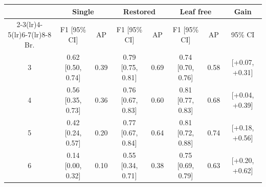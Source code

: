 \begin{tabular}{@{}cccccccc@{}}
\toprule
& \multicolumn{2}{c}{Single} & \multicolumn{2}{c}{Restored} & \multicolumn{2}{c}{Leaf free} & Gain\\
\cmidrule(lr){2-3}\cmidrule(lr){4-5}\cmidrule(lr){6-7}\cmidrule(lr){8-8}
Br. & F1 [95\% CI] & AP & F1 [95\% CI] & AP & F1 [95\% CI] & AP & 95\% CI\\
\midrule
3 & 0.62 [0.50, 0.74] & 0.39 & 0.79 [0.75, 0.81] & 0.69 & 0.74 [0.70, 0.76] & 0.58 & [+0.07, +0.31]\\
4 & 0.56 [0.35, 0.73] & 0.36 & 0.76 [0.67, 0.83] & 0.60 & 0.81 [0.77, 0.83] & 0.68 & [+0.04, +0.39]\\
5 & 0.42 [0.24, 0.57] & 0.20 & 0.77 [0.67, 0.84] & 0.64 & 0.81 [0.72, 0.88] & 0.74 & [+0.18, +0.56]\\
6 & 0.14 [0.00, 0.32] & 0.10 & 0.55 [0.34, 0.71] & 0.38 & 0.75 [0.69, 0.79] & 0.63 & [+0.20, +0.62]\\
\bottomrule
\end{tabular}
